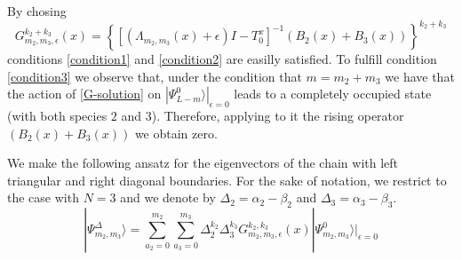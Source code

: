 \documentclass[11pt]{article}
\numberwithin{equation}{section}
\numberwithin{equation}{subsection}
\begin{document}
By chosing 
\begin{equation}\label{G-solution}
G_{m_{2},m_{3},\epsilon}^{k_{2}+k_{3}}(x)=\left\{\left[\left(\Lambda_{m_{2},m_{3}}(x)+\epsilon\right)I-T_{0}^{x}\right]^{-1}\left(B_{2}(x)+B_{3}(x)\right)\right\}^{k_{2}+k_{3}}
\end{equation}
conditions \eqref{condition1} and \eqref{condition2} are easilly satisfied. To fulfill condition \eqref{condition3} we observe that, under the condition that $m=m_{2}+m_{3}$ we have that the action of \eqref{G-solution} on $|\Psi_{L-m}^{0}\rangle|_{\epsilon=0}$ leads to a completely occupied state (with both species $2$ and $3$). Therefore, applying to it the rising operator$\left(B_{2}(x)+B_{3}(x)\right)$ we obtain zero.


{\color{blue}We make the following ansatz for the eigenvectors of the chain with left triangular and right diagonal boundaries. For the sake of notation, we restrict to the case with $N=3$ and we denote by $\Delta_{2}=\alpha_{2}-\beta_{2}$ and $\Delta_{3}=\alpha_{3}-\beta_{3}$.
\begin{equation}
|\Psi_{m_{2},m_{3}}^{\Delta}\rangle=\sum_{a_{2}=0}^{m_{2}}\sum_{a_{3}=0}^{m_{3}}\Delta_{2}^{k_{2}}\Delta_{3}^{k_{3}}G_{m_{2},m_{3},\epsilon}^{k_{2},k_{3}}(x)|\Psi_{m_{2},m_{3}}^{0}\rangle|_{\epsilon=0}
\end{equation}

}
\end{document}

